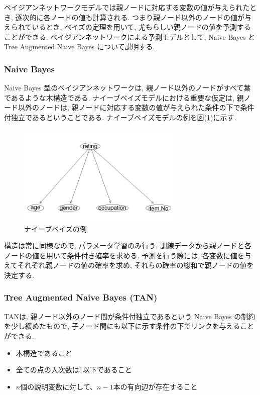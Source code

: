 \documentclass[a4paper]{jarticle}
\begin{document}
ベイジアンネットワークモデルでは親ノードに対応する変数の値が与えられたとき, 逐次的に各ノードの値も計算される. つまり親ノード以外のノードの値が与えられているとき, ベイズの定理を用いて, 尤もらしい親ノードの値を予測することができる. ベイジアンネットワークによる予測モデルとして, Naive Bayes と Tree Augmented Naive Bayes について説明する.

\subsubsection{Naive Bayes}

Naive Bayes 型のベイジアンネットワークは, 親ノード以外のノードがすべて葉であるような木構造である. ナイーブベイズモデルにおける重要な仮定は, 親ノード以外のノードは, 親ノードに対応する変数の値が与えられた条件の下で条件付独立であるということである. ナイーブベイズモデルの例を図(\ref{naive})に示す.

\begin{figure}[H]
 \begin{center}
  \includegraphics[width=80mm]{data/sample1.png}
 \end{center}
 \caption{ナイーブベイズの例}
 \label{naive}
\end{figure}

構造は常に同様なので, パラメータ学習のみ行う. 訓練データから親ノードと各ノードの値を用いて条件付き確率を求める. 予測を行う際には, 各変数に値を与えてそれぞれ親ノードの値の確率を求め, それらの確率の総和で親ノードの値を決定する.

\subsubsection{Tree Augmented Naive Bayes (TAN)}

TANは, 親ノード以外のノード間が条件付独立であるという Naive Bayes の制約を少し緩めたもので, 子ノード間にも以下に示す条件の下でリンクを与えることができる.~\cite{Friedman}

\begin{itemize}
\item 木構造であること

\item 全ての点の入次数は1以下であること

\item $n$個の説明変数に対して、$n-1$本の有向辺が存在すること
\end{itemize}
\end{document}
